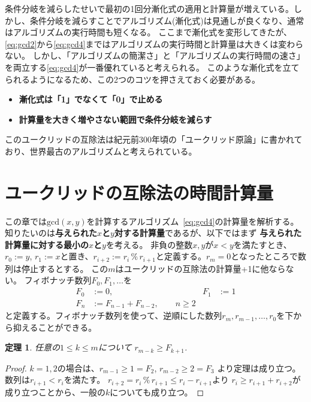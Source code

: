 \documentclass[a4paper,twoside,onecolumn,openany,article,10pt]{memoir}
\newtheorem{theorem}{定理}
\theoremstyle{remark}
\begin{document}
条件分岐を減らしたせいで最初の1回分漸化式の適用と計算量が増えている。しかし、条件分岐を減らすことでアルゴリズム(漸化式)は見通しが良くなり、通常はアルゴリズムの実行時間も短くなる。
ここまで漸化式を変形してきたが、\eqref{eq:gcd2}から\eqref{eq:gcd4}まではアルゴリズムの実行時間と計算量は大きくは変わらない。
しかし、「アルゴリズムの簡潔さ」と「アルゴリズムの実行時間の速さ」を両立する\eqref{eq:gcd4}が一番優れていると考えられる。
このような漸化式を立てられるようになるため、この2つのコツを押さえておく必要がある。
\begin{itemize}
\item \textbf{漸化式は「1」でなくて「0」で止める}
\item \textbf{計算量を大きく増やさない範囲で条件分岐を減らす}
\end{itemize}
このユークリッドの互除法は紀元前300年頃の「ユークリッド原論」に書かれており、世界最古のアルゴリズムと考えられている。

\section{ユークリッドの互除法の時間計算量}\label{sec:ceuclidean}
この章では$\mathrm{gcd}(x,y)$を計算するアルゴリズム~\eqref{eq:gcd4}の計算量を解析する。
知りたいのは\textbf{与えられた$x$と$y$対する計算量}であるが、以下ではまず
\textbf{与えられた計算量に対する最小の$x$と$y$}を考える。
非負の整数$x,y$が$x<y$を満たすとき、$r_0:=y$, $r_1:=x$と置き、$r_{i+2} := r_{i}\,\%\,r_{i+1}$と定義する。$r_m=0$となったところで数列は停止するとする。
この$m$はユークリッドの互除法の計算量+1に他ならない。
フィボナッチ数列$F_0,F_1,\dotsc$を
\begin{align*}
F_0 &:= 0,& F_1 &:= 1\\
F_n &:= F_{n-1} + F_{n-2}, \qquad n\ge 2
\end{align*}
と定義する。フィボナッチ数列を使って、逆順にした数列$r_m, r_{m-1}, \dotsc, r_0$を下から抑えることができる。

\begin{theorem}
任意の$1\le k \le m$について
$r_{m-k}\ge F_{k+1}$.
\end{theorem}
\begin{proof}
$k=1,2$の場合は、$r_{m-1}\ge 1 = F_2$, $r_{m-2} \ge 2 = F_3$ より定理は成り立つ。
数列は$r_{i+1}<r_i$を満たす。
$r_{i+2} = r_i\,\%\,r_{i+1} \le r_i - r_{i+1}$より $r_i \ge r_{i+1} + r_{i+2}$が成り立つことから、一般の$k$についても成り立つ。
\end{proof}
\end{document}
